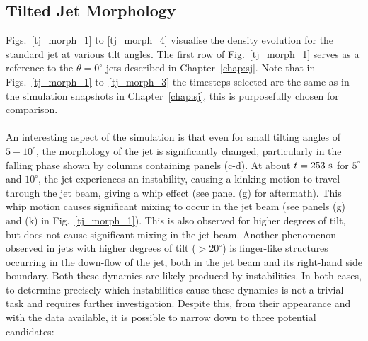 \documentclass[12pt]{ociamthesis}
\newcommand{\np}{\\ \\}
\newcommand{\degs}{^{\circ}}
\begin{document}
\subsection{Tilted Jet Morphology}
\label{subsec:steady}
Figs.~\ref{tj_morph_1} to \ref{tj_morph_4} visualise the density evolution for the standard jet at various tilt angles. The first row of Fig.~\ref{tj_morph_1} serves as a reference to the $\theta=0\degs$ jets described in Chapter~\ref{chap:sj}. Note that in Figs.~\ref{tj_morph_1} to~\ref{tj_morph_3} the timesteps selected are the same as in the simulation snapshots in Chapter~\ref{chap:sj}, this is purposefully chosen for comparison. \np
%
An interesting aspect of the simulation is that even for small tilting angles of $5-10^{\circ}$, the morphology of the jet is significantly changed, particularly in the falling phase shown by columns containing panels (c-d). At about $t=253~\rm{s}$ for $5^{\circ}$ and $10^{\circ}$, the jet experiences an instability, causing a kinking motion to travel through the jet beam, giving a whip effect (see panel (g) for aftermath). This whip motion causes significant mixing to occur in the jet beam (see panels (g) and (k) in Fig.~\ref{tj_morph_1}). This is also observed for higher degrees of tilt, but does not cause significant mixing in the jet beam. Another phenomenon observed in jets with higher degrees of tilt ($>20^{\circ}$) is finger-like structures occurring in the down-flow of the jet, both in the jet beam and its right-hand side boundary. Both these dynamics are likely produced by instabilities. In both cases, to determine precisely which instabilities cause these dynamics is not a trivial task and requires further investigation. Despite this, from their appearance and with the data available, it is possible to narrow down to three potential candidates:
\end{document}
